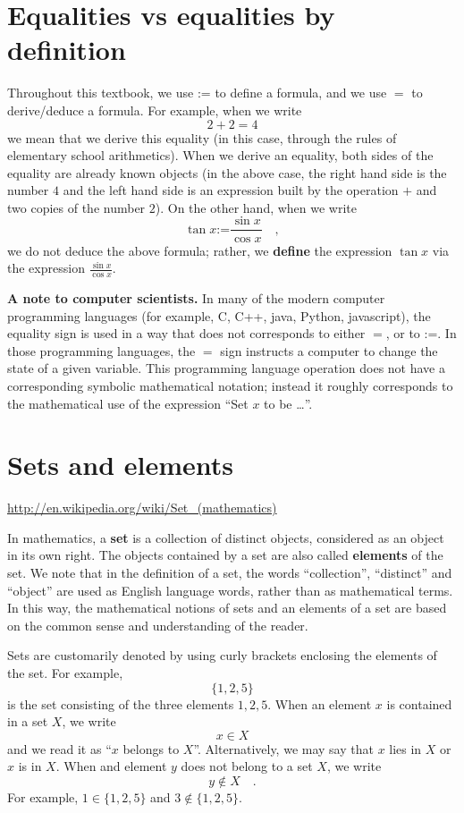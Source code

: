 \documentclass[12pt]{book}
\newcommand{\eqdef}{\textbf{:=}}
\renewcommand{\emph}{\textbf}
\begin{document}
\section{Equalities vs equalities by definition }
Throughout this textbook, we use $\eqdef$ to define a formula, and we use $=$ to derive/deduce a formula. For example, when we write
\[ 2+2=4
\]
we mean that we derive this equality (in this case, through the rules of elementary school arithmetics). When we derive an equality, both sides of the equality are already known objects (in the above case, the right hand side is the number $4$ and the left hand side is an expression built by the operation $+$ and two copies of the number $2$).  On the other hand, when we write
\[
\tan x\eqdef\frac{\sin x}{\cos x}\quad ,
\]
we do not deduce the above formula; rather, we \emph{define} the expression $\tan x$ via the expression $\displaystyle \frac{ \sin x}{\cos x}$.

\textbf{A note to computer scientists. } In many of the modern computer programming languages (for example, C, C++, java, Python, javascript), the equality sign is used in a way that does not corresponds to either $=$, or to $\eqdef$. In those programming languages, the $=$ sign instructs a computer to change the state of a given variable. This programming language operation does not have a corresponding symbolic mathematical notation; instead it roughly corresponds to the mathematical use of the expression ``Set $x$ to be \dots ''.
\section{Sets and elements}
\url{http://en.wikipedia.org/wiki/Set_(mathematics)}

In mathematics, a \emph{set} is a collection of distinct objects, considered as an object in its own right. The objects contained by a set are also called \emph{elements} of the set. We note that in the definition of a set, the words ``collection'', ``distinct'' and ``object'' are used as English language words, rather than as mathematical terms. In this way, the mathematical notions of sets and an elements of a set are based on the common sense and understanding of the reader.

Sets are customarily denoted by using curly brackets enclosing the elements of the set. For example,
\[
\{1,2,5\}
\]
is the set consisting of the three elements $1,2,5$. When an element $x$ is contained in a set $X$, we write
\[
x\in X
\]
and we read it as ``$x$ belongs to $X$''. Alternatively, we may say that $x$ lies in $X$ or $x$ is in $X$. When and element $y$ does not belong to a set $X$, we write
\[
y\notin X\quad.
\]
For example, $1\in \{1,2,5\}$ and $3\notin \{1,2,5\}$.
\end{document}

